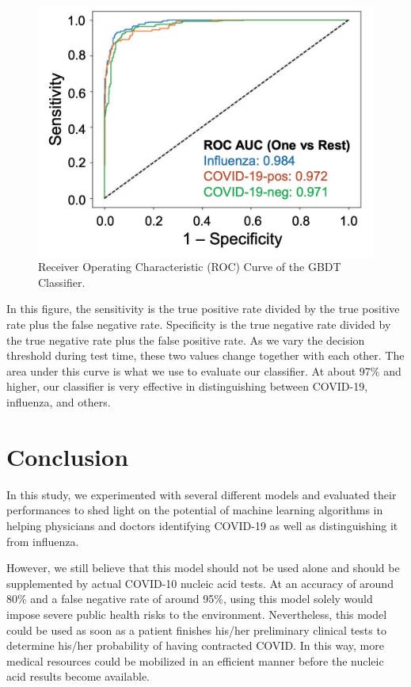 \documentclass[a4paper, 11pt]{article}
\begin{document}
\begin{figure}[H]
\centering
\includegraphics[scale=0.25]{roc.png}
\caption{Receiver Operating Characteristic (ROC) Curve of the GBDT Classifier.}
\label{Confirmed Cases}
\end{figure}

In this figure, the sensitivity is the true positive rate divided by the true positive rate plus the false negative rate. Specificity is the true negative rate divided by the true negative rate plus the false positive rate. As we vary the decision threshold during test time, these two values change together with each other. The area under this curve is what we use to evaluate our classifier. At about 97\% and higher, our classifier is very effective in distinguishing between COVID-19, influenza, and others.

\section*{Conclusion}
In this study, we experimented with several different models and evaluated their performances to shed light on the potential of machine learning algorithms in helping physicians and doctors identifying COVID-19 as well as distinguishing it from influenza. \par
However, we still believe that this model should not be used alone and should be supplemented by actual COVID-10 nucleic acid tests. At an accuracy of around 80\% and a false negative rate of around 95\%, using this model solely would impose severe public health risks to the environment. Nevertheless, this model could be used as soon as a patient finishes his/her preliminary clinical tests to determine his/her probability of having contracted COVID. In this way, more medical resources could be mobilized in an efficient manner before the nucleic acid results become available.
\end{document}
